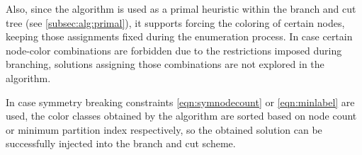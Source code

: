 Also, since the algorithm is used as a primal heuristic within the branch and cut tree (see \ref{subsec:alg:primal}), it supports forcing the coloring of certain nodes, keeping those assignments fixed during the enumeration process. In case certain node-color combinations are forbidden due to the restrictions imposed during branching, solutions assigning those combinations are not explored in the algorithm.

In case symmetry breaking constraints \ref{eqn:symnodecount} or \ref{eqn:minlabel} are used, the color classes obtained by the algorithm are sorted based on node count or minimum partition index respectively, so the obtained solution can be successfully injected into the branch and cut scheme.

